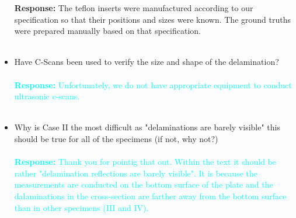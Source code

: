 \documentclass[11pt,a2paper]{report}
\begin{document}
\begin{itemize}
{			\textbf{Response:}
		The teflon inserts were manufactured according to our specification so that their positions and sizes were known.
		The ground truths were prepared manually based on that specification.}
		\\ \\
		\item Have C-Scans been used to verify the size and shape of the delamination?
			\\ \\
		\textcolor{Cyan}{
			\textbf{Response:}
		Unfortunately, we do not have appropriate equipment to conduct ultrasonic c-scans.}
		\\ \\
		\item Why is Case II the most difficult as "delaminations are barely visible" this should be true for all of the specimens (if not, why not?)
			\\ \\
		\textcolor{Cyan}{
			\textbf{Response:}
		Thank you for pointig that out.
	    Within the text it should be rather "delamination reflections are barely visible". It is because the measurements are conducted on the bottom surface of the plate and the dalaminations in the cross-section are farther away from the bottom surface than in other specimens (III and IV).
        }
		\\ \\
	\end{itemize}
\end{document}
